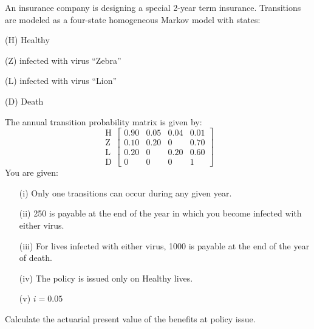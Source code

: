 An insurance company is designing a special 2-year term insurance. Transitions are modeled as a four-state homogeneous
Markov model with states:
\begin{description}
\item (H) Healthy
\item (Z) infected with virus ``Zebra''
\item (L) infected with virus ``Lion''
\item (D) Death
\end{description}
The annual transition probability matrix is given by:
\[ \begin{array}{c} \text{H} \\ \text{Z} \\ \text{L} \\ \text{D} \end{array}
   \left[\begin{array}{cccc} 
      0.90 & 0.05 & 0.04 & 0.01 \\ 0.10 & 0.20 & 0 & 0.70 \\ 0.20 & 0 & 0.20 & 0.60 \\ 0 & 0 & 0 & 1 \end{array}\right] \]
You are given:
\begin{itemize}
\item[(i)] Only one transitions can occur during any given year.
\item[(ii)] 250 is payable at the end of the year in which you become infected with either virus.
\item[(iii)] For lives infected with either virus, 1000 is payable at the end of the year of death.
\item[(iv)] The policy is issued only on Healthy lives.
\item[(v)] $i=0.05$
\end{itemize}
Calculate the actuarial present value of the benefits at policy issue.



